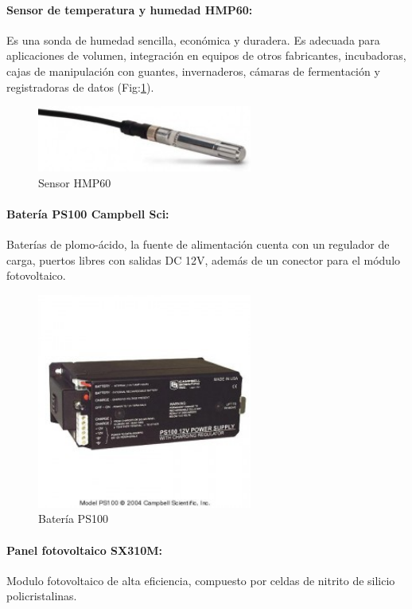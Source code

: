 \newpage
\paragraph{Sensor de temperatura y humedad HMP60:}
Es una sonda de humedad sencilla, económica y duradera. Es adecuada para aplicaciones de volumen, integración en equipos de otros fabricantes, incubadoras, cajas de manipulación con guantes, invernaderos, cámaras de fermentación y registradoras de datos (Fig:\ref{hr}).

\begin{figure}[h!]
        \centering
        \includegraphics[width=200pt]{images/SensorThmp60}
        \caption{Sensor HMP60}
	\label{hr}
\end{figure}

\paragraph{Batería PS100 Campbell Sci:}
Baterías de plomo-ácido, la fuente de alimentación cuenta con un regulador de carga, puertos libres con salidas DC 12V, además de un conector para el módulo fotovoltaico.

\begin{figure}[h!]
        \centering
        \includegraphics[width=200pt]{images/bateria}
        \caption{Batería PS100} 
\end{figure}

\paragraph{Panel fotovoltaico SX310M:}
Modulo fotovoltaico de alta eficiencia, compuesto por celdas de nitrito de silicio policristalinas.

